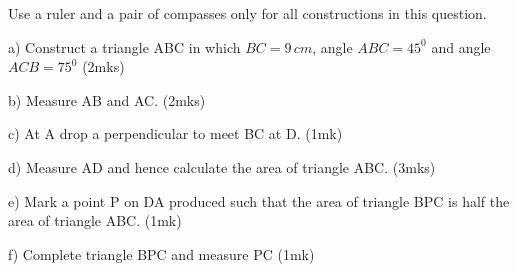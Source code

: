 \documentclass[
  a4paperpaper,
]{scrbook}
\begin{document}
\begin{tcolorbox}[enhanced jigsaw, left=2mm, colframe=quarto-callout-note-color-frame, toptitle=1mm, opacitybacktitle=0.6, rightrule=.15mm, colbacktitle=quarto-callout-note-color!10!white, colback=white, arc=.35mm, breakable, leftrule=.75mm, bottomtitle=1mm, bottomrule=.15mm, title=\textcolor{quarto-callout-note-color}{\faInfo}\hspace{0.5em}{Example 2}, titlerule=0mm, coltitle=black, toprule=.15mm, opacityback=0]

Use a ruler and a pair of compasses only for all constructions in this
question.

a) Construct a triangle ABC in which \(BC=9\, cm\), angle \(ABC=45^0\)
and angle \(ACB=75^0\) \hspace{14.2cm} (2mks)

b) Measure AB and AC. \hspace{10.6cm} (2mks)

c) At A drop a perpendicular to meet BC at D. \hspace{7cm} (1mk)

d) Measure AD and hence calculate the area of triangle
ABC.\hspace{4.4cm} (3mks)

e) Mark a point P on DA produced such that the area of triangle BPC is
half the area of triangle ABC. \hspace{13.3cm} (1mk)

f) Complete triangle BPC and measure PC \hspace{7.5cm} (1mk)

\end{tcolorbox}
\end{document}
